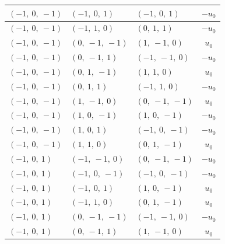 \documentclass[11pt]{article}
\theoremstyle{definition}
\begin{document}
\begin{longtable}{|l|l|l|c|}
    \hline
    $\left( -1, \  0, \  -1\right)$ & $\left( -1, \  0, \  1\right)$ & $\left( -1, \  0, \  1\right)$ & $- u_{0}$ \\
    \hline
    $\left( -1, \  0, \  -1\right)$ & $\left( -1, \  1, \  0\right)$ & $\left( 0, \  1, \  1\right)$ & $- u_{0}$ \\
    \hline
    $\left( -1, \  0, \  -1\right)$ & $\left( 0, \  -1, \  -1\right)$ & $\left( 1, \  -1, \  0\right)$ & $u_{0}$ \\
    \hline
    $\left( -1, \  0, \  -1\right)$ & $\left( 0, \  -1, \  1\right)$ & $\left( -1, \  -1, \  0\right)$ & $- u_{0}$ \\
    \hline
    $\left( -1, \  0, \  -1\right)$ & $\left( 0, \  1, \  -1\right)$ & $\left( 1, \  1, \  0\right)$ & $u_{0}$ \\
    \hline
    $\left( -1, \  0, \  -1\right)$ & $\left( 0, \  1, \  1\right)$ & $\left( -1, \  1, \  0\right)$ & $- u_{0}$ \\
    \hline
    $\left( -1, \  0, \  -1\right)$ & $\left( 1, \  -1, \  0\right)$ & $\left( 0, \  -1, \  -1\right)$ & $u_{0}$ \\
    \hline
    $\left( -1, \  0, \  -1\right)$ & $\left( 1, \  0, \  -1\right)$ & $\left( 1, \  0, \  -1\right)$ & $- u_{0}$ \\
    \hline
    $\left( -1, \  0, \  -1\right)$ & $\left( 1, \  0, \  1\right)$ & $\left( -1, \  0, \  -1\right)$ & $- u_{0}$ \\
    \hline
    $\left( -1, \  0, \  -1\right)$ & $\left( 1, \  1, \  0\right)$ & $\left( 0, \  1, \  -1\right)$ & $u_{0}$ \\
    \hline
    $\left( -1, \  0, \  1\right)$ & $\left( -1, \  -1, \  0\right)$ & $\left( 0, \  -1, \  -1\right)$ & $- u_{0}$ \\
    \hline
    $\left( -1, \  0, \  1\right)$ & $\left( -1, \  0, \  -1\right)$ & $\left( -1, \  0, \  -1\right)$ & $- u_{0}$ \\
    \hline
    $\left( -1, \  0, \  1\right)$ & $\left( -1, \  0, \  1\right)$ & $\left( 1, \  0, \  -1\right)$ & $u_{0}$ \\
    \hline
    $\left( -1, \  0, \  1\right)$ & $\left( -1, \  1, \  0\right)$ & $\left( 0, \  1, \  -1\right)$ & $u_{0}$ \\
    \hline
    $\left( -1, \  0, \  1\right)$ & $\left( 0, \  -1, \  -1\right)$ & $\left( -1, \  -1, \  0\right)$ & $- u_{0}$ \\
    \hline
    $\left( -1, \  0, \  1\right)$ & $\left( 0, \  -1, \  1\right)$ & $\left( 1, \  -1, \  0\right)$ & $u_{0}$ \\

\end{longtable}
\end{document}
